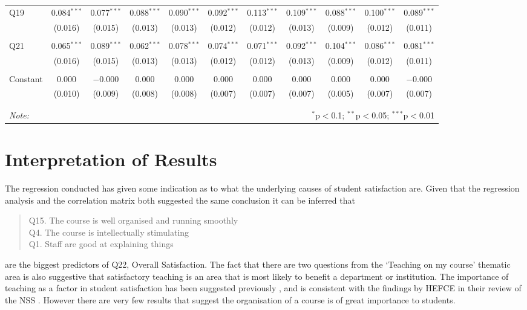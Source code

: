 \documentclass[11pt,a4paper]{report}
\begin{document}
\begin{table}
\begin{tabular}{@{\extracolsep{8pt}}lcccccccccc}
	Q19 & 0.084$^{***}$ & 0.077$^{***}$ & 0.088$^{***}$ & 0.090$^{***}$ & 0.092$^{***}$ & 0.113$^{***}$ & 0.109$^{***}$ & 0.088$^{***}$ & 0.100$^{***}$ & 0.089$^{***}$ \\ 
	& (0.016) & (0.015) & (0.013) & (0.013) & (0.012) & (0.012) & (0.013) & (0.009) & (0.012) & (0.011) \\ 
	& & & & & & & & & & \\ 
	Q21 & 0.065$^{***}$ & 0.089$^{***}$ & 0.062$^{***}$ & 0.078$^{***}$ & 0.074$^{***}$ & 0.071$^{***}$ & 0.092$^{***}$ & 0.104$^{***}$ & 0.086$^{***}$ & 0.081$^{***}$ \\ 
	& (0.016) & (0.015) & (0.013) & (0.013) & (0.012) & (0.012) & (0.013) & (0.009) & (0.012) & (0.011) \\ 
	& & & & & & & & & & \\ 
	Constant & 0.000 & $-$0.000 & 0.000 & 0.000 & 0.000 & 0.000 & 0.000 & 0.000 & 0.000 & $-$0.000 \\ 
	& (0.010) & (0.009) & (0.008) & (0.008) & (0.007) & (0.007) & (0.007) & (0.005) & (0.007) & (0.007) \\ 
	& & & & & & & & & & \\ 
	\hline 
	\hline \\[-1.8ex] 
	\textit{Note:}  & \multicolumn{10}{r}{$^{*}$p$<$0.1; $^{**}$p$<$0.05;  $^{***}$p$<$0.01} \\ 
\end{tabular} 
\end{table}

\section{Interpretation of Results}
The regression conducted has given some indication as to what the underlying causes of student satisfaction are. Given that the regression analysis and the correlation matrix both suggested the same conclusion it can be inferred that 
\begin{quote}
	Q15. The course is well organised and running smoothly\\
	Q4. The course is intellectually stimulating\\
	Q1. Staff are good at explaining things\\
\end{quote}
are the biggest predictors of Q22, Overall Satisfaction. The fact that there are two questions from the `Teaching on my course' thematic area is also suggestive that satisfactory teaching is an area that is most likely to benefit a department or institution. The importance of teaching as a factor in student satisfaction has been suggested previously \cite{ginns2007students}, and is consistent with the findings by HEFCE in their review of the NSS \cite{HEFCEreport2014}. However there are very few results that suggest the organisation of a course is of great importance to students.
\end{document}

